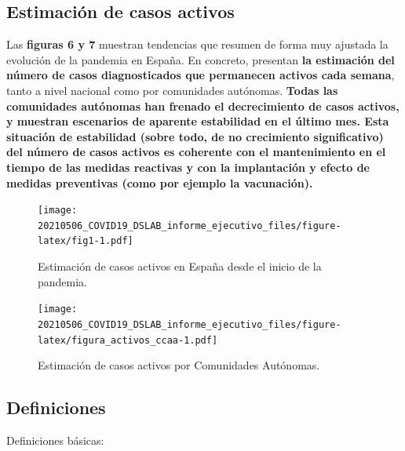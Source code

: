 \documentclass[
  11pt,
]{article}
\begin{document}
\clearpage

\setcounter{page}{9}

\hypertarget{estimaciuxf3n-de-casos-activos}{%
\subsection{Estimación de casos
activos}\label{estimaciuxf3n-de-casos-activos}}

Las \textbf{figuras 6 y 7} muestran tendencias que resumen de forma muy
ajustada la evolución de la pandemia en España. En concreto, presentan
\textbf{la estimación del número de casos diagnosticados que permanecen
activos cada semana}, tanto a nivel nacional como por comunidades
autónomas. \textbf{Todas las comunidades autónomas han frenado el
decrecimiento de casos activos, y muestran escenarios de aparente
estabilidad en el último mes. Esta situación de estabilidad (sobre todo,
de no crecimiento significativo) del número de casos activos es
coherente con el mantenimiento en el tiempo de las medidas reactivas y
con la implantación y efecto de medidas preventivas (como por ejemplo la
vacunación).}

\vspace{0.2cm}

\begin{figure}
\centering
\texttt{[image: 20210506\_COVID19\_DSLAB\_informe\_ejecutivo\_files/figure-latex/fig1-1.pdf]}
\caption{\label{fig:fig17a_res} Estimación de casos activos en España
desde el inicio de la pandemia.}
\end{figure}

\begin{figure}
\centering
\texttt{[image: 20210506\_COVID19\_DSLAB\_informe\_ejecutivo\_files/figure-latex/figura\_activos\_ccaa-1.pdf]}
\caption{\label{fig:figura_activos_ccaa} Estimación de casos activos por
Comunidades Autónomas.}
\end{figure}

\newpage
\setcounter{page}{11}

\hypertarget{definiciones}{%
\subsection{Definiciones}\label{definiciones}}

Definiciones básicas:
\end{document}
